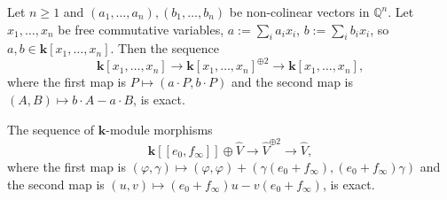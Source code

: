 \documentclass[10pt,a4paper]{amsart}
\begin{document}
\begin{lem}\label{lem:comm:alg}
Let $n\geq1$ and $(a_1,\ldots,a_n),(b_1,\ldots,b_n)$ be non-colinear vectors in $\mathbb Q^n$. 
Let $x_1,\ldots,x_n$ be free commutative variables, $a:=\sum_i a_ix_i$, $b:=\sum_i b_ix_i$, so 
$a,b\in \mathbf k[x_1,\ldots,x_n]$. Then the sequence 
$$
\mathbf k[x_1,\ldots,x_n]\to\mathbf k[x_1,\ldots,x_n]^{\oplus2}\to\mathbf k[x_1,\ldots,x_n], 
$$
where the first map is $P\mapsto (a\cdot P,b\cdot P)$ and the second map is $(A,B)\mapsto b\cdot A-a\cdot B$, is exact. 
\end{lem}

\begin{lem}\label{lem:exact:seq:0505}
The sequence of $\mathbf k$-module morphisms 
\begin{equation}\label{exact:seq:0705}
\mathbf k[[e_0,f_\infty]]\oplus \hat V\to \hat V^{\oplus 2}\to \hat V, 
\end{equation}
where the first map is $(\varphi,\gamma)\mapsto (\varphi,\varphi)+(\gamma(e_0+f_\infty),(e_0+f_\infty)\gamma)$
and the second map is $(u,v)\mapsto (e_0+f_\infty)u-v(e_0+f_\infty)$, is exact. 
\end{lem}
\end{document}
